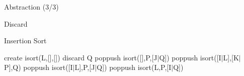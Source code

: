 \begin{frame}{Abstraction (3/3)}
  \begin{block}{Discard}
    \begin{figure}
      \centering
    \end{figure}
  \end{block}
\end{frame}

\begin{frame}{Insertion Sort}
  \begin{enumerate}
     { \small {} {create} {isort(L,[],[])} }
     { \small {} {discard} {Q} }
     { \small {} {poppush} {isort([],P,[J$|$Q])} }
     { \small {} {poppush} {isort([I$|$L],[K$|$P],Q)} }
     { \small {} {poppush} {isort([I$|$L],P,[J$|$Q])} }
     { \small {} {poppush} {isort(L,P,[I$|$Q])} }
  \end{enumerate}
\end{frame}


